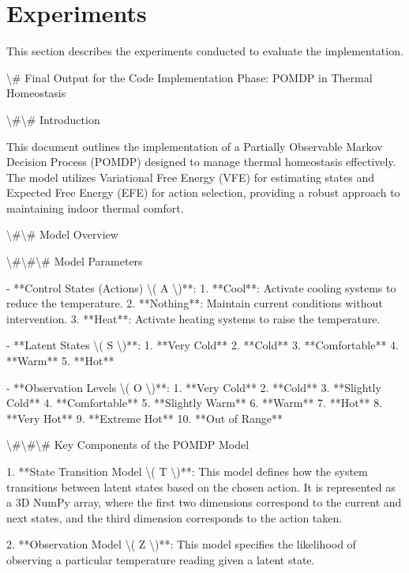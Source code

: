 \documentclass[11pt,a4paper]{article}
\begin{document}
\section{Experiments}

This section describes the experiments conducted to evaluate the implementation.

\textbackslash{}# Final Output for the Code Implementation Phase: POMDP in Thermal Homeostasis

\textbackslash{}#\textbackslash{}# Introduction

This document outlines the implementation of a Partially Observable Markov Decision Process (POMDP) designed to manage thermal homeostasis effectively. The model utilizes Variational Free Energy (VFE) for estimating states and Expected Free Energy (EFE) for action selection, providing a robust approach to maintaining indoor thermal comfort.

\textbackslash{}#\textbackslash{}# Model Overview

\textbackslash{}#\textbackslash{}#\textbackslash{}# Model Parameters

- **Control States (Actions) \textbackslash{}( A \textbackslash{})**:
  1. **Cool**: Activate cooling systems to reduce the temperature.
  2. **Nothing**: Maintain current conditions without intervention.
  3. **Heat**: Activate heating systems to raise the temperature.

- **Latent States \textbackslash{}( S \textbackslash{})**:
  1. **Very Cold**
  2. **Cold**
  3. **Comfortable**
  4. **Warm**
  5. **Hot**

- **Observation Levels \textbackslash{}( O \textbackslash{})**:
  1. **Very Cold**
  2. **Cold**
  3. **Slightly Cold**
  4. **Comfortable**
  5. **Slightly Warm**
  6. **Warm**
  7. **Hot**
  8. **Very Hot**
  9. **Extreme Hot**
  10. **Out of Range**

\textbackslash{}#\textbackslash{}#\textbackslash{}# Key Components of the POMDP Model

1. **State Transition Model \textbackslash{}( T \textbackslash{})**: This model defines how the system transitions between latent states based on the chosen action. It is represented as a 3D NumPy array, where the first two dimensions correspond to the current and next states, and the third dimension corresponds to the action taken.

2. **Observation Model \textbackslash{}( Z \textbackslash{})**: This model specifies the likelihood of observing a particular temperature reading given a latent state. 
\end{document}
